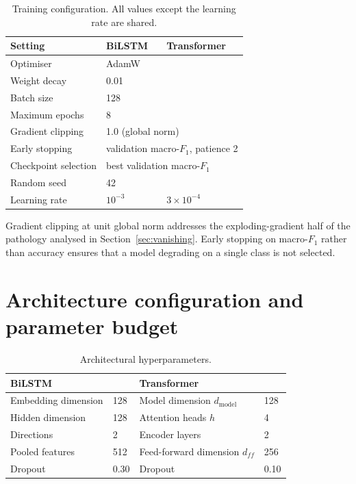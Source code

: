 \begin{table}[ht]
\centering
\caption{Training configuration. All values except the learning rate are shared.}
\label{tab:training_config}
\begin{tabular}{lll}
\toprule
\textbf{Setting} & \textbf{BiLSTM} & \textbf{Transformer} \\
\midrule
Optimiser              & \multicolumn{2}{l}{AdamW \cite{kingma2015,loshchilov2019}} \\
Weight decay           & \multicolumn{2}{l}{0.01} \\
Batch size             & \multicolumn{2}{l}{128} \\
Maximum epochs         & \multicolumn{2}{l}{8} \\
Gradient clipping      & \multicolumn{2}{l}{1.0 (global norm)} \\
Early stopping         & \multicolumn{2}{l}{validation macro-$F_1$, patience 2} \\
Checkpoint selection   & \multicolumn{2}{l}{best validation macro-$F_1$} \\
Random seed            & \multicolumn{2}{l}{42} \\
\midrule
Learning rate          & $10^{-3}$ & $3\times10^{-4}$ \\
\bottomrule
\end{tabular}
\end{table}

Gradient clipping at unit global norm addresses the exploding-gradient half of the pathology
analysed in Section~\ref{sec:vanishing}. Early stopping on macro-$F_1$ rather than
accuracy ensures that a model degrading on a single class is not selected.

\section{Architecture configuration and parameter budget}

\begin{table}[ht]
\centering
\caption{Architectural hyperparameters.}
\label{tab:arch_config}
\begin{tabular}{llll}
\toprule
\textbf{BiLSTM} & & \textbf{Transformer} & \\
\midrule
Embedding dimension & 128 & Model dimension $d_{\text{model}}$ & 128 \\
Hidden dimension    & 128 & Attention heads $h$               & 4 \\
Directions          & 2   & Encoder layers                    & 2 \\
Pooled features     & 512 & Feed-forward dimension $d_{ff}$   & 256 \\
Dropout             & 0.30 & Dropout                          & 0.10 \\
\bottomrule
\end{tabular}
\end{table}

